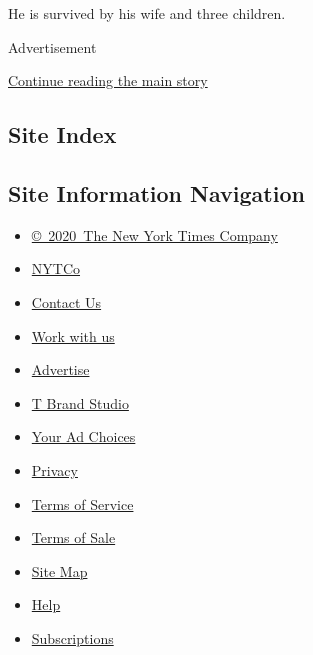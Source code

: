 He is survived by his wife and three children.

Advertisement

\protect\hyperlink{after-bottom}{Continue reading the main story}

\hypertarget{site-index}{%
\subsection{Site Index}\label{site-index}}

\hypertarget{site-information-navigation}{%
\subsection{Site Information
Navigation}\label{site-information-navigation}}

\begin{itemize}
\tightlist
\item
  \href{https://help.nytimes.com/hc/en-us/articles/115014792127-Copyright-notice}{©~2020~The
  New York Times Company}
\end{itemize}

\begin{itemize}
\tightlist
\item
  \href{https://www.nytco.com/}{NYTCo}
\item
  \href{https://help.nytimes.com/hc/en-us/articles/115015385887-Contact-Us}{Contact
  Us}
\item
  \href{https://www.nytco.com/careers/}{Work with us}
\item
  \href{https://nytmediakit.com/}{Advertise}
\item
  \href{http://www.tbrandstudio.com/}{T Brand Studio}
\item
  \href{https://www.nytimes.com/privacy/cookie-policy\#how-do-i-manage-trackers}{Your
  Ad Choices}
\item
  \href{https://www.nytimes.com/privacy}{Privacy}
\item
  \href{https://help.nytimes.com/hc/en-us/articles/115014893428-Terms-of-service}{Terms
  of Service}
\item
  \href{https://help.nytimes.com/hc/en-us/articles/115014893968-Terms-of-sale}{Terms
  of Sale}
\item
  \href{https://spiderbites.nytimes.com}{Site Map}
\item
  \href{https://help.nytimes.com/hc/en-us}{Help}
\item
  \href{https://www.nytimes.com/subscription?campaignId=37WXW}{Subscriptions}
\end{itemize}
